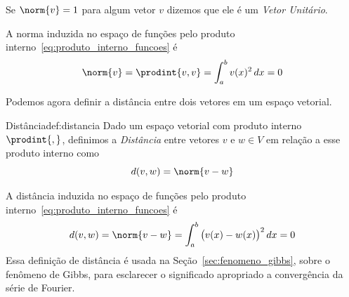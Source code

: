 Se \(\norm{v}=1\) para algum vetor $v$ dizemos que ele é um
\emph{Vetor Unitário}.

A norma induzida no espaço de funções pelo produto
interno~\eqref{eq:produto_interno_funcoes} é
\[
  \norm{v} = \prodint{v, v} = \int_a^b v(x)^2 \, dx = 0
\]

Podemos agora definir a distância entre dois vetores em um espaço vetorial.

\begin{definicao}{Distância}{def:distancia}
  Dado um espaço vetorial com produto interno \(\prodint{,}\), definimos a
  \emph{Distância} entre vetores $v$ e $w\in V$
  em relação a esse produto interno como
  \[
    d(v, w) = \norm{v-w}
  \]
\end{definicao}

A distância induzida no espaço de funções pelo produto
interno~\eqref{eq:produto_interno_funcoes} é
\[
  d(v, w) = \norm{v-w} = \int_a^b \big(v(x)-w(x)\big)^2 \, dx = 0
\]
Essa definição de distância é usada na Seção~\ref{sec:fenomeno_gibbs},
sobre o fenômeno de Gibbs, para esclarecer o significado apropriado a convergência
da série de Fourier.

